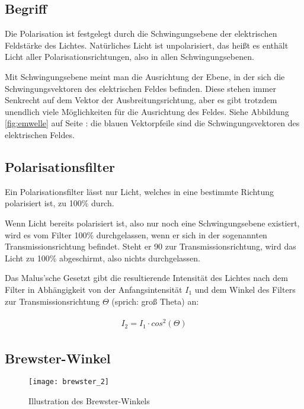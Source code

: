 \subsection{Begriff}

Die Polarisation ist festgelegt durch die Schwingungsebene der elektrischen Feldstärke des Lichtes. Natürliches Licht ist unpolarisiert, das heißt es enthält Licht aller Polarisationsrichtungen, also in allen Schwingungsebenen.

Mit Schwingungsebene meint man die Ausrichtung der Ebene, in der sich die Schwingungsvektoren des elektrischen Feldes befinden. Diese stehen immer Senkrecht auf dem Vektor der Ausbreitungsrichtung, aber es gibt trotzdem unendlich viele Möglichkeiten für die Ausrichtung des Feldes. Siehe Abbildung \ref{fig:emwelle} auf Seite \pageref{fig:emwelle}: die blauen Vektorpfeile sind die Schwingungsvektoren des elektrischen Feldes.

\subsection{Polarisationsfilter}

Ein Polarisationsfilter lässt nur Licht, welches in eine bestimmte Richtung polarisiert ist, zu 100\% durch. 

Wenn Licht bereits polarisiert ist, also nur noch eine Schwingungsebene existiert, wird es vom Filter 100\% durchgelassen, wenn er sich in der sogenannten Transmissionsrichtung befindet. Steht er 90\degree{} zur Transmissionsrichtung, wird das Licht zu 100\% abgeschirmt, also nichts durchgelassen.

Das Malus'sche Gesetzt gibt die resultierende Intensität des Lichtes nach dem Filter in Abhängigkeit von der Anfangsintensität $I_1$ und dem Winkel des Filters zur Transmissionsrichtung $\Theta$ (sprich: \glqq groß Theta\grqq ) an:

\begin{align}
\begin{split}
	I_2 = I_1 \cdot cos^2(\Theta)
\end{split}
\end{align}

\newpage
\subsection{Brewster-Winkel}

\begin{wrapfigure}{o}{0.5\textwidth}
	\centering \texttt{[image: brewster\_2]}
	\caption{Illustration des Brewster-Winkels}
	\label{fig:brewster}
\end{wrapfigure}

